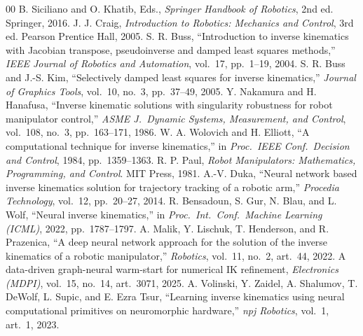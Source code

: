 \documentclass[conference]{IEEEtran}
\begin{document}
\begin{thebibliography}{00}
 B. Siciliano and O. Khatib, Eds., \textit{Springer Handbook of Robotics}, 2nd ed. Springer, 2016.
 J. J. Craig, \textit{Introduction to Robotics: Mechanics and Control}, 3rd ed. Pearson Prentice Hall, 2005.
 S. R. Buss, ``Introduction to inverse kinematics with Jacobian transpose, pseudoinverse and damped least squares methods,'' \textit{IEEE Journal of Robotics and Automation}, vol.\ 17, pp.\ 1--19, 2004.
 S. R. Buss and J.-S. Kim, ``Selectively damped least squares for inverse kinematics,'' \textit{Journal of Graphics Tools}, vol.\ 10, no.\ 3, pp.\ 37--49, 2005.
 Y. Nakamura and H. Hanafusa, ``Inverse kinematic solutions with singularity robustness for robot manipulator control,'' \textit{ASME J.\ Dynamic Systems, Measurement, and Control}, vol.\ 108, no.\ 3, pp.\ 163--171, 1986.
 W. A. Wolovich and H. Elliott, ``A computational technique for inverse kinematics,'' in \textit{Proc.\ IEEE Conf.\ Decision and Control}, 1984, pp.\ 1359--1363.
 R. P. Paul, \textit{Robot Manipulators: Mathematics, Programming, and Control}. MIT Press, 1981.
 A.-V. Duka, ``Neural network based inverse kinematics solution for trajectory tracking of a robotic arm,'' \textit{Procedia Technology}, vol.\ 12, pp.\ 20--27, 2014.
 R. Bensadoun, S. Gur, N. Blau, and L. Wolf, ``Neural inverse kinematics,'' in \textit{Proc.\ Int.\ Conf.\ Machine Learning (ICML)}, 2022, pp.\ 1787--1797.
 A. Malik, Y. Lischuk, T. Henderson, and R. Prazenica, ``A deep neural network approach for the solution of the inverse kinematics of a robotic manipulator,'' \textit{Robotics}, vol.\ 11, no.\ 2, art.\ 44, 2022.
 A data-driven graph-neural warm-start for numerical IK refinement, \textit{Electronics (MDPI)}, vol.\ 15, no.\ 14, art.\ 3071, 2025.
 A. Volinski, Y. Zaidel, A. Shalumov, T. DeWolf, L. Supic, and E. Ezra Tsur, ``Learning inverse kinematics using neural computational primitives on neuromorphic hardware,'' \textit{npj Robotics}, vol.\ 1, art.\ 1, 2023.
\end{thebibliography}
\end{document}
